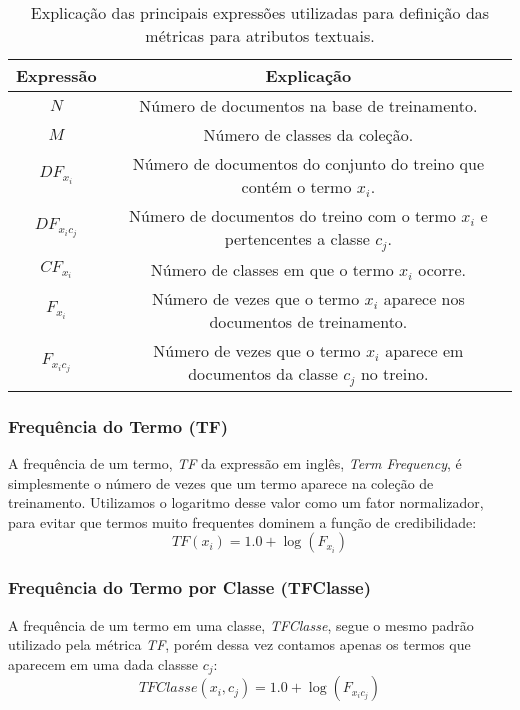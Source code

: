 \begin{table}[ht*]
\centering
\begin{tabular}{|c|c|}
\toprule
    \textbf{Expressão} & \textbf{Explicação} \\
\midrule
    $N$           & Número de documentos na base de treinamento. \tabularnewline \hline
    $M$           & Número de classes da coleção. \tabularnewline \hline
    $DF_{x_i} $   & Número de documentos do conjunto do treino que contém o termo $x_i$. \tabularnewline \hline
    $DF_{x_ic_j}$ & Número de documentos do treino com o termo $x_i$ e pertencentes a classe $c_j$. \tabularnewline \hline
    $CF_{x_i}$    & Número de classes em que o termo $x_i$ ocorre. \tabularnewline \hline 
    $F_{x_i}$     & Número de vezes que o termo $x_i$ aparece nos documentos de treinamento. \tabularnewline \hline
    $F_{x_ic_j}$  & Número de vezes que o termo $x_i$ aparece em documentos da classe $c_j$ no treino. \tabularnewline 
\bottomrule
\end{tabular}
\caption{Explicação das principais expressões utilizadas para definição das métricas para atributos textuais.}
\label{table::metricas_textuais}
\end{table}


\subsubsection{Frequência do Termo (TF)}
\label{subsubsection::sumtf}

A frequência de um termo, \textit{TF} da expressão em inglês, \textit{Term Frequency}, é simplesmente o número de vezes que um termo aparece na coleção de treinamento. Utilizamos o logaritmo desse valor como um fator normalizador, para evitar que termos muito frequentes dominem a função de credibilidade:
\begin{equation}\label{eqn::sumtf}
   TF(x_i) = 1.0 + \log{ ( F_{x_i} ) }
\end{equation}


\subsubsection{Frequência do Termo por Classe (TFClasse)}
\label{subsubsection::tf}

A frequência de um termo em uma classe, \textit{TFClasse}, segue o mesmo padrão utilizado pela métrica \textit{TF}, porém dessa vez contamos apenas os termos que aparecem em uma dada classse $c_j$:
\begin{equation}\label{eqn::tf}
   TFClasse(x_i, c_j) = 1.0 + \log{ ( F_{x_ic_j} ) }
\end{equation}


